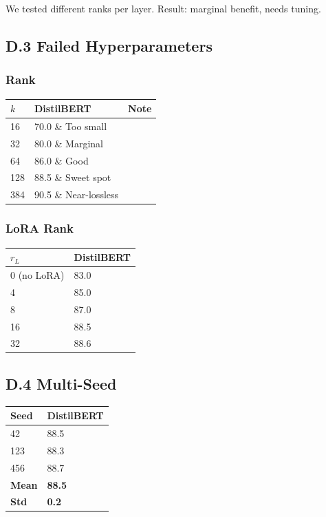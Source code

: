 We tested different ranks per layer. Result: marginal benefit, needs tuning.

\subsection{D.3 Failed Hyperparameters}

\subsubsection{Rank}

\begin{table}[H]
\centering
\small
\begin{tabular}{lll}
\toprule
\textbf{$k$} & \textbf{DistilBERT} & \textbf{Note} \\
\midrule
16 & 70.0 \& Too small \\
32 & 80.0 \& Marginal \\
64 & 86.0 \& Good \\
128 & 88.5 \& Sweet spot \\
384 & 90.5 \& Near-lossless \\
\bottomrule
\end{tabular}
\end{table}

\subsubsection{LoRA Rank}

\begin{table}[H]
\centering
\small
\begin{tabular}{ll}
\toprule
\textbf{$r_L$} & \textbf{DistilBERT} \\
\midrule
0 (no LoRA) & 83.0 \\
4 & 85.0 \\
8 & 87.0 \\
16 & 88.5 \\
32 & 88.6 \\
\bottomrule
\end{tabular}
\end{table}

\subsection{D.4 Multi-Seed}

\begin{table}[H]
\centering
\small
\begin{tabular}{ll}
\toprule
\textbf{Seed} & \textbf{DistilBERT} \\
\midrule
42 & 88.5 \\
123 & 88.3 \\
456 & 88.7 \\
\textbf{Mean} & \textbf{88.5} \\
\textbf{Std} & \textbf{0.2} \\
\bottomrule
\end{tabular}
\end{table}

